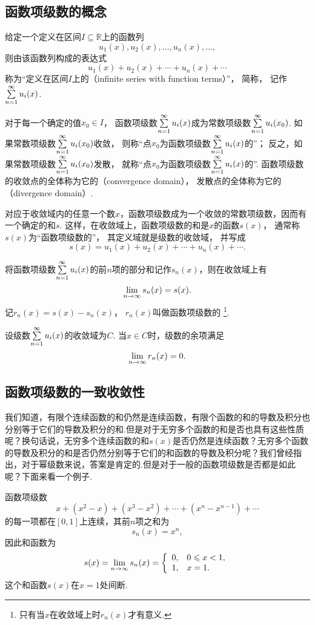 \subsection{函数项级数的概念}
\begin{definition}\label{definition:无穷级数.实函数项级数的概念}
给定一个定义在区间\(I \subseteq \mathbb{R}\)上的函数列\[
u_1(x),u_2(x),\dotsc,u_n(x),\dotsc,
\]
则由该函数列构成的表达式\[
u_1(x)+u_2(x)+\dotsb+u_n(x)+\dotsb
\]
称为“定义在区间\(I\)上的（infinite series with function terms）”，%
简称，%
记作\(\sum\limits_{n=1}^\infty u_i(x)\).

对于每一个确定的值\(x_0 \in I\)，%
函数项级数\(\sum\limits_{n=1}^\infty u_i(x)\)成为常数项级数\(\sum\limits_{n=1}^\infty u_i(x_0)\).
如果常数项级数\(\sum\limits_{n=1}^\infty u_i(x_0)\)收敛，%
则称“点\(x_0\)为函数项级数\(\sum\limits_{n=1}^\infty u_i(x)\)的”；
反之，如果常数项级数\(\sum\limits_{n=1}^\infty u_i(x_0)\)发散，%
就称“点\(x_0\)为函数项级数\(\sum\limits_{n=1}^\infty u_i(x)\)的”.
函数项级数的收敛点的全体称为它的（convergence domain），%
发散点的全体称为它的（divergence domain）.

对应于收敛域内的任意一个数\(x\)，函数项级数成为一个收敛的常数项级数，因而有一个确定的和\(s\).
这样，在收敛域上，函数项级数的和是\(x\)的函数\(s(x)\)，%
通常称\(s(x)\)为“函数项级数的”，%
其定义域就是级数的收敛域，%
并写成\[
s(x) = u_1(x)+u_2(x)+\dotsb+u_n(x)+\dotsb.
\]

将函数项级数\(\sum\limits_{n=1}^\infty u_i(x)\)的前\(n\)项的部分和记作\(s_n(x)\)，则在收敛域上有\[
\lim\limits_{n\to\infty} s_n(x) = s(x).
\]
记\(r_n(x) = s(x)-s_n(x)\)，%
\(r_n(x)\)叫做函数项级数的%
\footnote{只有当\(x\)在收敛域上时\(r_n(x)\)才有意义.}.
\end{definition}

\begin{property}
设级数\(\sum\limits_{n=1}^\infty u_i(x)\)的收敛域为\(C\).
当\(x \in C\)时，级数的余项满足\[
\lim\limits_{n\to\infty} r_n(x) = 0.
\]
\end{property}

\subsection{函数项级数的一致收敛性}
我们知道，有限个连续函数的和仍然是连续函数，有限个函数的和的导数及积分也分别等于它们的导数及积分的和.但是对于无穷多个函数的和是否也具有这些性质呢？换句话说，无穷多个连续函数的和\(s(x)\)是否仍然是连续函数？无穷多个函数的导数及积分的和是否仍然分别等于它们的和函数的导数及积分呢？我们曾经指出，对于幂级数来说，答案是肯定的.但是对于一般的函数项级数是否都是如此呢？下面来看一个例子.
\begin{example}
函数项级数\[
x + (x^2-x) + (x^3-x^2) + \dotsb + (x^n-x^{n-1}) + \dotsb
\]的每一项都在\([0,1]\)上连续，其前\(n\)项之和为\[
s_n(x) = x^n,
\]因此和函数为\[
s(x) = \lim\limits_{n\to\infty} s_n(x)
= \left\{ \begin{array}{ll}
0, & 0 \leqslant x < 1, \\
1, & x = 1.
\end{array} \right.
\]
这个和函数\(s(x)\)在\(x=1\)处间断.
\end{example}

